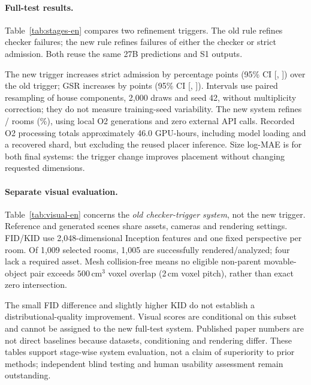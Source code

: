 \paragraph{Full-test results.}
Table~\ref{tab:stages-en} compares two refinement triggers. The old rule refines checker failures; the new rule refines failures of either the checker or strict admission. Both reuse the same 27B predictions and S1 outputs.



The new trigger increases strict admission by \StrictGain{} percentage points (95\% CI [\StrictLo{}, \StrictHi{}]) over the old trigger; GSR increases by \CheckerGain{} points (95\% CI [\CheckerLo{}, \CheckerHi{}]). Intervals use paired resampling of \NumClusters{} house components, 2,000 draws and seed 42, without multiplicity correction; they do not measure training-seed variability. The new system refines \Escalated{}/\NumRooms{} rooms (\EscalatedPct{}\%), using \OtwoRounds{} local O2 generations and zero external API calls. Recorded O2 processing totals approximately 46.0 GPU-hours, including model loading and a recovered shard, but excluding the reused placer inference. Size log-MAE is \SizeError{} for both final systems: the trigger change improves placement without changing requested dimensions.

\paragraph{Separate visual evaluation.}
Table~\ref{tab:visual-en} concerns the \emph{old checker-trigger system}, not the new trigger. Reference and generated scenes share assets, cameras and rendering settings. FID/KID use 2,048-dimensional Inception features and one fixed perspective per room. Of 1,009 selected rooms, 1,005 are successfully rendered/analyzed; four lack a required asset. Mesh collision-free means no eligible non-parent movable-object pair exceeds $500\,\mathrm{cm}^3$ voxel overlap (2\,cm voxel pitch), rather than exact zero intersection.



The small FID difference and slightly higher KID do not establish a distributional-quality improvement. Visual scores are conditional on this subset and cannot be assigned to the new full-test system. Published paper numbers are not direct baselines because datasets, conditioning and rendering differ. These tables support stage-wise system evaluation, not a claim of superiority to prior methods; independent blind testing and human usability assessment remain outstanding.
